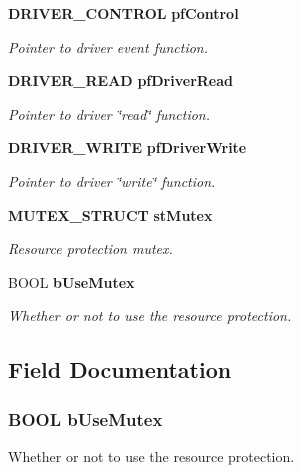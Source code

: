\begin{DoxyCompactItemize}
{\bf DRIVER\_\-CONTROL} {\bf pfControl}
\begin{DoxyCompactList}\small\item\em Pointer to driver event function. \item\end{DoxyCompactList}\item 
{\bf DRIVER\_\-READ} {\bf pfDriverRead}
\begin{DoxyCompactList}\small\item\em Pointer to driver \char`\"{}read\char`\"{} function. \item\end{DoxyCompactList}\item 
{\bf DRIVER\_\-WRITE} {\bf pfDriverWrite}
\begin{DoxyCompactList}\small\item\em Pointer to driver \char`\"{}write\char`\"{} function. \item\end{DoxyCompactList}\item 
{\bf MUTEX\_\-STRUCT} {\bf stMutex}
\begin{DoxyCompactList}\small\item\em Resource protection mutex. \item\end{DoxyCompactList}\item 
BOOL {\bf bUseMutex}
\begin{DoxyCompactList}\small\item\em Whether or not to use the resource protection. \item\end{DoxyCompactList}\end{DoxyCompactItemize}


\subsection{Field Documentation}
\subsubsection[{bUseMutex}]{\setlength{\rightskip}{0pt plus 5cm}BOOL {\bf bUseMutex}}\label{struct_d_r_i_v_e_r___s_t_r_u_c_t_a87b9abf3b6be1dbc17f4aea83655a203}


Whether or not to use the resource protection. 
